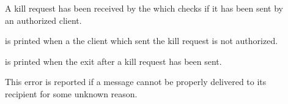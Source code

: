 \begin{description}
\item[] A kill request has been
  received by the \MP which checks if it has been sent by an authorized client.

\item[] is printed when a the client which sent the kill request is not
  authorized.

\item[] is printed when the
  \MP{} exit after a kill request has been sent.

\item[]
This error is reported if a message cannot be properly delivered to
its recipient for some unknown reason.

\end{description}



